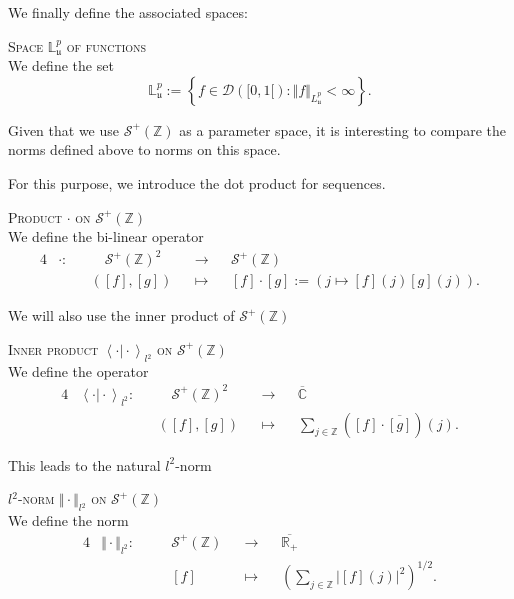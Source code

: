 We finally define the associated spaces:
\begin{de}{\textsc{Space $\mathds{L}_{\mathfrak{u}}^{p}$ of functions}\\}\label{de1.4.10}
We define the set
\[\mathds{L}_{\mathfrak{u}}^{p} := \left\{f \in \mathcal{D}([0, 1[) : \Vert f \Vert_{L_{\mathfrak{u}}^{p}} < \infty \right\}.\]
\end{de}

Given that we use $\mathcal{S}^{+}(\mathds{Z})$ as a parameter space, it is interesting to compare the norms defined above to norms on this space.

For this purpose, we introduce the dot product for sequences.
\begin{de}{\textsc{Product $\cdot$ on $\mathcal{S}^{+}(\mathds{Z})$}\\}\label{de1.4.11}
We define the bi-linear operator
\begin{alignat*}{4}
& \cdot : && \quad \mathcal{S}^{+}(\mathds{Z})^{2} &&\rightarrow&& \mathcal{S}^{+}(\mathds{Z})\\
& && ([f], [g]) && \mapsto && [f]\cdot[g] := \left(j \mapsto [f](j)[g](j)\right).
\end{alignat*}
\end{de}

We will also use the inner product of $\mathcal{S}^{+}(\mathds{Z})$
\begin{de}{\textsc{Inner product $\left\langle \cdot \vert \cdot \right\rangle_{l^{2}}$ on $\mathcal{S}^{+}(\mathds{Z})$}\\}\label{de1.4.12}
We define the operator
\begin{alignat*}{4}
& \left\langle \cdot \vert \cdot \right\rangle_{l^{2}} : && \quad \mathcal{S}^{+}(\mathds{Z})^{2} &&\rightarrow&& \overline{\mathds{C}}\\
& && ([f], [g]) && \mapsto && \sum\limits_{j \in \mathds{Z}} ([f]\cdot\overline{[g]})(j).
\end{alignat*}
\end{de}

This leads to the natural $l^{2}$-norm
\begin{de}{\textsc{$l^{2}$-norm $\Vert \cdot \Vert_{l^{2}}$ on $\mathcal{S}^{+}(\mathds{Z})$}\\}\label{de1.4.13}
We define the norm
\begin{alignat*}{4}
& \Vert \cdot \Vert_{l^{2}} : && \quad \mathcal{S}^{+}(\mathds{Z}) &&\rightarrow&& \overline{\mathds{R}_{+}}\\
& &&\quad [f] && \mapsto && \left(\sum\limits_{j \in \mathds{Z}} \vert[f](j)\vert^{2}\right)^{1/2}.
\end{alignat*}
\end{de}

